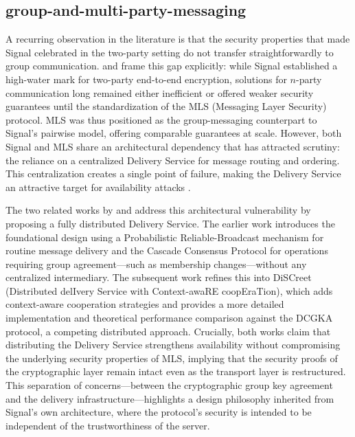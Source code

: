 \subsection{group-and-multi-party-messaging}

A recurring observation in the literature is that the security properties that made Signal celebrated in the two-party setting do not transfer straightforwardly to group communication. \textcite{paillat2024} and \textcite{paillat2025} frame this gap explicitly: while Signal established a high-water mark for two-party end-to-end encryption, solutions for $n$-party communication long remained either inefficient or offered weaker security guarantees until the standardization of the MLS (Messaging Layer Security) protocol. MLS was thus positioned as the group-messaging counterpart to Signal's pairwise model, offering comparable guarantees at scale. However, both Signal and MLS share an architectural dependency that has attracted scrutiny: the reliance on a centralized Delivery Service for message routing and ordering. This centralization creates a single point of failure, making the Delivery Service an attractive target for availability attacks \parencite{paillat2024}.

The two related works by \textcite{paillat2024} and \textcite{paillat2025} address this architectural vulnerability by proposing a fully distributed Delivery Service. The earlier work \parencite{paillat2024} introduces the foundational design using a Probabilistic Reliable-Broadcast mechanism for routine message delivery and the Cascade Consensus Protocol for operations requiring group agreement—such as membership changes—without any centralized intermediary. The subsequent work \parencite{paillat2025} refines this into DiSCreet (Distributed delIvery Service with Context-awaRE coopEraTion), which adds context-aware cooperation strategies and provides a more detailed implementation and theoretical performance comparison against the DCGKA protocol, a competing distributed approach. Crucially, both works claim that distributing the Delivery Service strengthens availability without compromising the underlying security properties of MLS, implying that the security proofs of the cryptographic layer remain intact even as the transport layer is restructured. This separation of concerns—between the cryptographic group key agreement and the delivery infrastructure—highlights a design philosophy inherited from Signal's own architecture, where the protocol's security is intended to be independent of the trustworthiness of the server.

